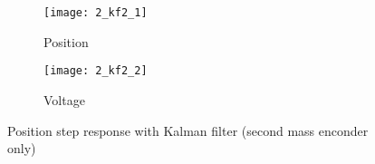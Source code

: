 \begin{figure*}[h]
	\centering
	\begin{subfigure}{0.5\columnwidth}
		\texttt{[image: 2\_kf2\_1]}
		\caption{Position}
	\end{subfigure}
	\begin{subfigure}{0.45\columnwidth}
		\texttt{[image: 2\_kf2\_2]}
		\caption{Voltage}
	\end{subfigure}
	\caption{Position step response with Kalman filter (second mass enconder only)}
\end{figure*}

